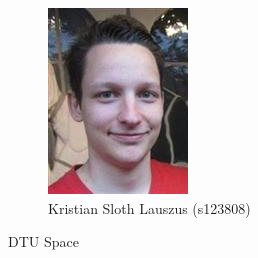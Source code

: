 \begin{center}
\begin{figure}[h!]
	\centering
	\begin{minipage}{0.40\linewidth}
	\begin{center}
	\includegraphics[scale=0.55]{figs/kristian.jpeg} \\
    Kristian Sloth Lauszus (s123808) \\ [10pt]
		\vspace{0.15cm}
	\end{center}
	\end{minipage}
\end{figure}


\end{center}
\begin{flushleft}
\subtitle\\
DTU Space\\
\dato
\end{flushleft}

